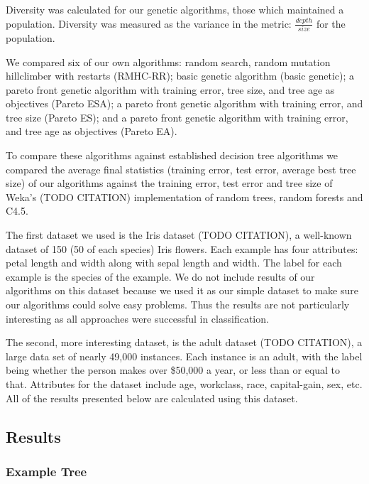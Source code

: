 \documentclass{acm_proc_article-sp}
\begin{document}
Diversity was calculated for our genetic algorithms, those which maintained a population. Diversity was measured as the variance in the metric: $\frac{depth}{size}$ for the population.

We compared six of our own algorithms: random search, random mutation hillclimber with restarts (RMHC-RR); basic genetic algorithm (basic genetic); a pareto front genetic algorithm with training error, tree size, and tree age as objectives (Pareto ESA); a pareto front genetic algorithm with training error, and tree size (Pareto ES); and a pareto front genetic algorithm with training error, and tree age as objectives (Pareto EA).

To compare these algorithms against established decision tree algorithms we compared the average final statistics (training error, test error, average best tree size) of our algorithms against the training error, test error and tree size of Weka's (TODO CITATION) implementation of random trees, random forests and C4.5.

The first dataset we used is the Iris dataset (TODO CITATION), a well-known dataset of 150 (50 of each species) Iris flowers. Each example has four attributes: petal length and width along with sepal length and width. The label for each example is the species of the example. We do not include results of our algorithms on this dataset because we used it as our simple dataset to make sure our algorithms could solve easy problems. Thus the results are not particularly interesting as all approaches were successful in classification.

The second, more interesting dataset, is the adult dataset (TODO CITATION), a large data set of nearly 49,000 instances. Each instance is an adult, with the label being whether the person makes over \$50,000 a year, or less than or equal to that. Attributes for the dataset include age, workclass, race, capital-gain, sex, etc. All of the results presented below are calculated using this dataset.

\subsection{Results}

\subsubsection{Example Tree}
\end{document}
